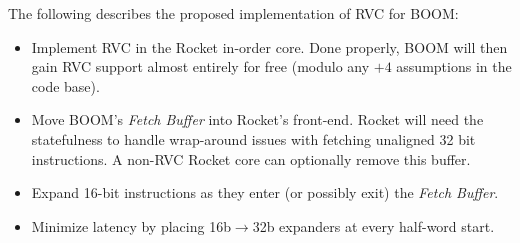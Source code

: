 The following describes the proposed implementation of RVC for BOOM:

\begin{itemize}
\item Implement RVC in the Rocket in-order core.  Done properly, BOOM will then gain RVC support almost entirely for free (modulo any $+4$ assumptions in the code base).
\item Move BOOM's {\em Fetch Buffer} into Rocket's front-end. Rocket will need the statefulness to handle wrap-around issues with fetching unaligned 32 bit instructions.  A non-RVC Rocket core can optionally remove this buffer. 
\item Expand 16-bit instructions as they enter (or possibly exit) the {\em Fetch Buffer}. 
\item Minimize latency by placing 16b$\rightarrow$32b expanders at every half-word start. 
\end{itemize}


